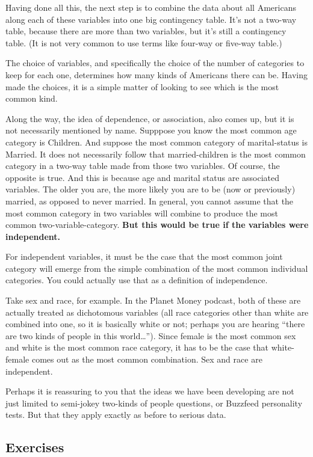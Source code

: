 \documentclass[
  openany]{book}
\begin{document}
Having done all this, the next step is to combine the data about all Americans along each of these variables into one big contingency table. It's not a two-way table, because there are more than two variables, but it's still a contingency table. (It is not very common to use terms like four-way or five-way table.)

The choice of variables, and specifically the choice of the number of categories to keep for each one, determines how many kinds of Americans there can be. Having made the choices, it is a simple matter of looking to see which is the most common kind.

Along the way, the idea of dependence, or association, also comes up, but it is not necessarily mentioned by name. Supppose you know the most common age category is Children. And suppose the most common category of marital-status is Married. It does not necessarily follow that married-children is the most common category in a two-way table made from those two variables. Of course, the opposite is true. And this is because age and marital status are associated variables. The older you are, the more likely you are to be (now or previously) married, as opposed to never married. In general, you cannot assume that the most common category in two variables will combine to produce the most common two-variable-category. \textbf{But this would be true if the variables were independent.}

For independent variables, it must be the case that the most common joint category will emerge from the simple combination of the most common individual categories. You could actually use that as a definition of independence.

Take sex and race, for example. In the Planet Money podcast, both of these are actually treated as dichotomous variables (all race categories other than white are combined into one, so it is basically white or not; perhaps you are hearing ``there are two kinds of people in this world\ldots{}''). Since female is the most common sex and white is the most common race category, it has to be the case that white-female comes out as the most common combination. Sex and race are independent.

Perhaps it is reassuring to you that the ideas we have been developing are not just limited to semi-jokey two-kinds of people questions, or Buzzfeed personality tests. But that they apply exactly as before to serious data.

\hypertarget{exercises}{%
\subsection*{Exercises}\label{exercises}}
\end{document}

